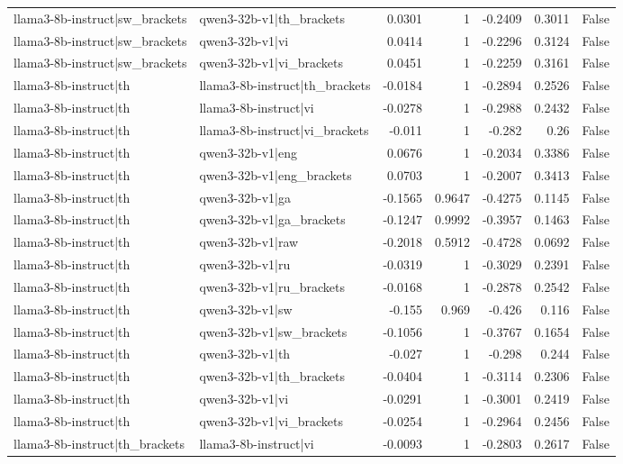 \begin{table}
\begin{tabular}{l l r r r r l}
llama3-8b-instruct|sw_brackets & qwen3-32b-v1|th_brackets & 0.0301 & 1 & -0.2409 & 0.3011 & False \\
llama3-8b-instruct|sw_brackets & qwen3-32b-v1|vi & 0.0414 & 1 & -0.2296 & 0.3124 & False \\
llama3-8b-instruct|sw_brackets & qwen3-32b-v1|vi_brackets & 0.0451 & 1 & -0.2259 & 0.3161 & False \\
llama3-8b-instruct|th & llama3-8b-instruct|th_brackets & -0.0184 & 1 & -0.2894 & 0.2526 & False \\
llama3-8b-instruct|th & llama3-8b-instruct|vi & -0.0278 & 1 & -0.2988 & 0.2432 & False \\
llama3-8b-instruct|th & llama3-8b-instruct|vi_brackets & -0.011 & 1 & -0.282 & 0.26 & False \\
llama3-8b-instruct|th & qwen3-32b-v1|eng & 0.0676 & 1 & -0.2034 & 0.3386 & False \\
llama3-8b-instruct|th & qwen3-32b-v1|eng_brackets & 0.0703 & 1 & -0.2007 & 0.3413 & False \\
llama3-8b-instruct|th & qwen3-32b-v1|ga & -0.1565 & 0.9647 & -0.4275 & 0.1145 & False \\
llama3-8b-instruct|th & qwen3-32b-v1|ga_brackets & -0.1247 & 0.9992 & -0.3957 & 0.1463 & False \\
llama3-8b-instruct|th & qwen3-32b-v1|raw & -0.2018 & 0.5912 & -0.4728 & 0.0692 & False \\
llama3-8b-instruct|th & qwen3-32b-v1|ru & -0.0319 & 1 & -0.3029 & 0.2391 & False \\
llama3-8b-instruct|th & qwen3-32b-v1|ru_brackets & -0.0168 & 1 & -0.2878 & 0.2542 & False \\
llama3-8b-instruct|th & qwen3-32b-v1|sw & -0.155 & 0.969 & -0.426 & 0.116 & False \\
llama3-8b-instruct|th & qwen3-32b-v1|sw_brackets & -0.1056 & 1 & -0.3767 & 0.1654 & False \\
llama3-8b-instruct|th & qwen3-32b-v1|th & -0.027 & 1 & -0.298 & 0.244 & False \\
llama3-8b-instruct|th & qwen3-32b-v1|th_brackets & -0.0404 & 1 & -0.3114 & 0.2306 & False \\
llama3-8b-instruct|th & qwen3-32b-v1|vi & -0.0291 & 1 & -0.3001 & 0.2419 & False \\
llama3-8b-instruct|th & qwen3-32b-v1|vi_brackets & -0.0254 & 1 & -0.2964 & 0.2456 & False \\
llama3-8b-instruct|th_brackets & llama3-8b-instruct|vi & -0.0093 & 1 & -0.2803 & 0.2617 & False \\

\end{tabular}
\end{table}
